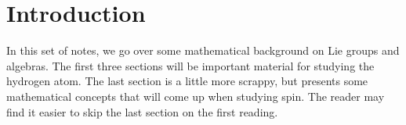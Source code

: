 \section{Introduction}
In this set of notes, we go over some mathematical background on Lie groups and algebras. The first three sections will be important material for studying the hydrogen atom. The last section is a little more scrappy, but presents some mathematical concepts that will come up when studying spin. The reader may find it easier to skip the last section on the first reading.
